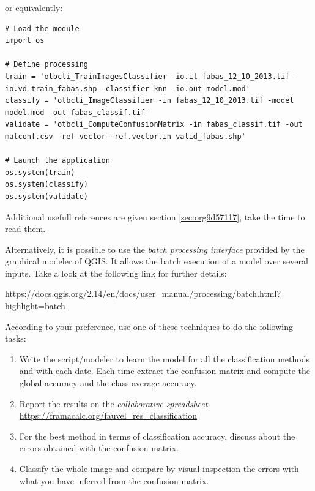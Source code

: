 \documentclass[a4paper,11pt,DIV=18]{scrartcl}
\begin{document}
or equivalently:

\begin{verbatim}
# Load the module
import os

# Define processing
train = 'otbcli_TrainImagesClassifier -io.il fabas_12_10_2013.tif -io.vd train_fabas.shp -classifier knn -io.out model.mod' 
classify = 'otbcli_ImageClassifier -in fabas_12_10_2013.tif -model model.mod -out fabas_classif.tif'
validate = 'otbcli_ComputeConfusionMatrix -in fabas_classif.tif -out matconf.csv -ref vector -ref.vector.in valid_fabas.shp'

# Launch the application
os.system(train)
os.system(classify)
os.system(validate)
\end{verbatim}

Additional usefull references are  given section \ref{sec:org9d57117}, take the
time to read them.

Alternatively, it  is possible to  use the \emph{batch  processing interface}
provided  by the  graphical  modeler  of QGIS.   It  allows the  batch
execution of a model over several inputs. Take a look at the following
link for further details:

\begin{center}
\url{https://docs.qgis.org/2.14/en/docs/user\_manual/processing/batch.html?highlight=batch}
\end{center}

According to  your preference, use one  of these techniques to  do the
following tasks:

\begin{work}
\begin{enumerate}
\item Write  the   script/modeler  to  learn  the  model   for  all  the
classification methods and  with each date.  Each  time extract the
confusion  matrix and  compute the  global accuracy  and the  class
average accuracy.
\item Report   the   results    on   the   \emph{collaborative   spreadsheet}:
\url{https://framacalc.org/fauvel\_res\_classification}
\item For  the best method  in terms of classification  accuracy, discuss
about the errors obtained with the confusion matrix.
\item Classify the  whole image  and  compare by  visual inspection  the
errors with what you have inferred from the confusion matrix.
\end{enumerate}
\end{work}
\end{document}
